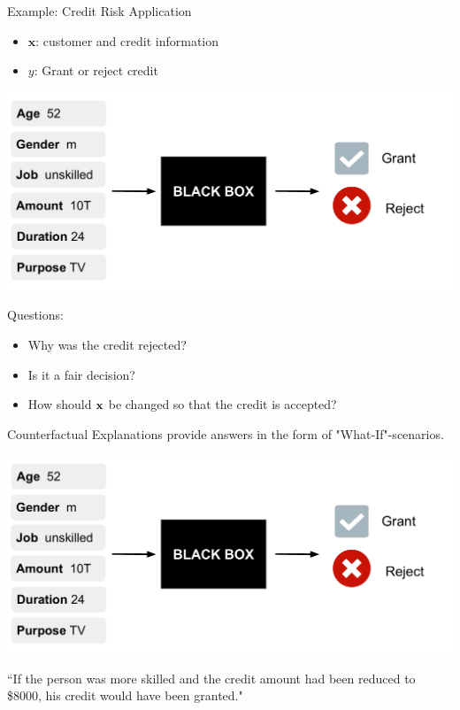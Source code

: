 \documentclass[11pt,compress,t,notes=noshow, xcolor=table]{beamer}
\begin{document}
\begin{vbframe}{Example: Credit Risk Application} 
	\begin{itemize}
		\item $\textbf{x}$: customer and credit information
		\item $y$: Grant or reject credit
	\end{itemize}
	\begin{center}\includegraphics[width=0.65\linewidth, page=1]{figure/counterfactuals_credit.pdf} \end{center}
	
	Questions: 
	\begin{itemize}
		\item Why was the credit rejected? 
		\item Is it a fair decision? 
		\item How should $\xv$ be changed so that the credit is accepted?  
	\end{itemize}
	
	\framebreak
	Counterfactual Explanations provide answers in the form of "What-If"-scenarios. 
	\begin{center}\includegraphics[width=0.65\linewidth, page=2]{figure/counterfactuals_credit.pdf} \end{center}
	
	``If the person was more skilled and the credit amount had been reduced to \$8000, his credit would have been granted."  \\[0.2cm]
	
	

\end{vbframe}
\end{document}
